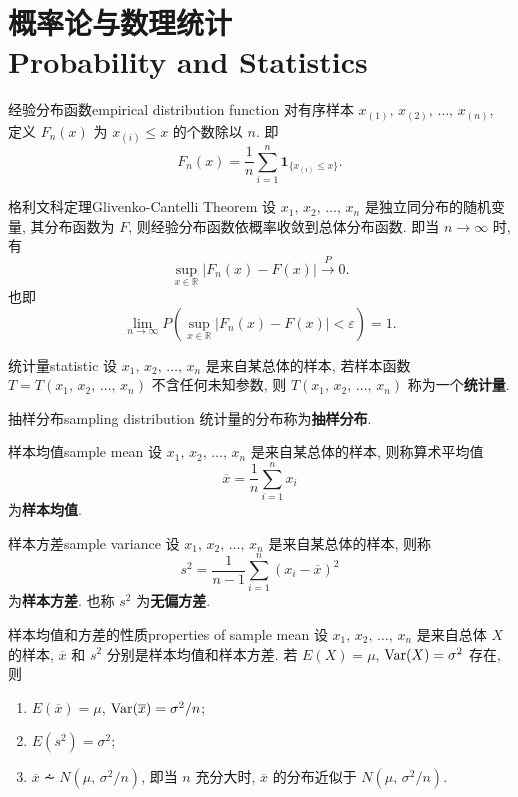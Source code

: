 \section{概率论与数理统计 \\Probability and Statistics}

\begin{defbox}{经验分布函数}{empirical distribution function}
	对有序样本 $x_{(1)},\,x_{(2)},\,\dots,\,x_{(n)}$, 定义 $F_n(x)$ 为 $x_{(i)}\leq x$ 的个数除以 $n$.  即
	\[
		F_n(x)=\frac{1}{n}\sum_{i=1}^n\mathbf{1}_{\{x_{(i)}\leq x\}}.
		\]
\end{defbox}

\begin{theorembox}{格利文科定理}{Glivenko-Cantelli Theorem}
	设 $x_1,\,x_2,\,\dots,\,x_n$ 是独立同分布的随机变量, 其分布函数为 $F$, 则经验分布函数依概率收敛到总体分布函数.  即当 $n\to\infty$ 时, 有
	\[
		\sup_{x\in\mathbb{R}}|F_n(x)-F(x)|\xrightarrow{P}0.
	\]
	也即
	\[
		\lim_{n\to\infty}P\left(\sup_{x\in\mathbb{R}}|F_n(x)-F(x)|<\varepsilon\right)=1.
	\]
\end{theorembox}

\begin{defbox}{统计量}{statistic}
	设 $x_1,\,x_2,\,\dots,\,x_n$ 是来自某总体的样本, 若样本函数 $T=T(x_1,\,x_2,\,\dots,\,x_n)$ 不含任何未知参数, 则 $T(x_1,\,x_2,\,\dots,\,x_n)$ 称为一个\textbf{统计量}.
\end{defbox}

\begin{defbox}{抽样分布}{sampling distribution}
	统计量的分布称为\textbf{抽样分布}.
\end{defbox}

\begin{defbox}{样本均值}{sample mean}
	设 $x_1,\,x_2,\,\dots,\,x_n$ 是来自某总体的样本, 则称算术平均值
	\[
		\overline{x}=\frac{1}{n}\sum_{i=1}^nx_i
	\]
	为\textbf{样本均值}.
\end{defbox}

\begin{defbox}{样本方差}{sample variance}
	设 $x_1,\,x_2,\,\dots,\,x_n$ 是来自某总体的样本, 则称
	\[
		s^2=\frac{1}{n-1}\sum_{i=1}^n(x_i-\overline{x})^2
	\]
	为\textbf{样本方差}.  也称 $s^2$ 为\textbf{无偏方差}.
\end{defbox}

\begin{theorembox}{样本均值和方差的性质}{properties of sample mean}
	设 $x_1,\,x_2,\,\dots,\,x_n$ 是来自总体 $X$ 的样本, $\overline{x}$ 和 $s^2$ 分别是样本均值和样本方差.  若 $E(X)=\mu$, $\mathop{\mathrm{Var}}\nolimits(X)=\sigma^2$ 存在, 则
	\begin{enumerate}
		\item $E(\overline{x})=\mu$, $\mathop{\mathrm{Var}}\nolimits(\overline{x})=\sigma^2/n$;
		\item $E(s^2)=\sigma^2$;
		\item $\overline{x}\dotsim N(\mu,\,\sigma^2/n)$, 即当 $n$ 充分大时, $\overline{x}$ 的分布近似于 $N(\mu,\,\sigma^2/n)$.
	\end{enumerate}
\end{theorembox}

